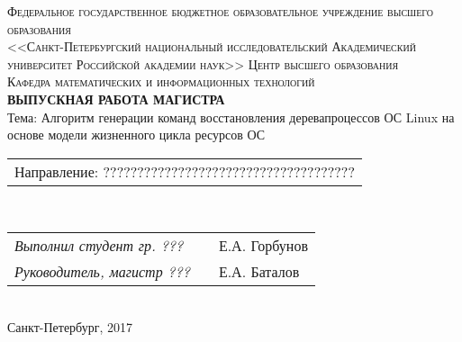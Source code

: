 \begin{titlepage}

\newcommand{\HRule}{\rule{\linewidth}{0.5mm}} %

\begin{center}
 

\textsc{Федеральное государственное бюджетное
образовательное учреждение высшего образования \\
<<Санкт-Петербургский национальный исследовательский
Академический университет Российской академии наук>>}
\textsc{Центр высшего образования}\\
\vspace{0.5cm}
\textsc{Кафедра математических и информационных технологий}\\[5cm]

{ \Large \bfseries ВЫПУСКНАЯ РАБОТА МАГИСТРА }\\
{ \large  Тема: Алгоритм генерации команд восстановления деревапроцессов ОС Linux на основе модели жизненного цикла ресурсов ОС}\\[1.9cm]
 

\begin{minipage}{1\textwidth}
\begin{flushleft} \large

\begin{tabular}{l}
Направление: ?????????????????????????????????????
\end{tabular}
\\[0.5cm]
\begin{tabular}{lcl}
\emph{Выполнил студент гр. ???} & \underline{\hspace{3cm}} & Е.А. Горбунов\\
\emph{Руководитель, магистр ???} &  \underline{\hspace{3cm}} & Е.А. Баталов \\ %
\end{tabular}
\end{flushleft}
\end{minipage}\\[7.5cm]



{\large Санкт-Петербург, 2017}
\end{center} 

\end{titlepage}